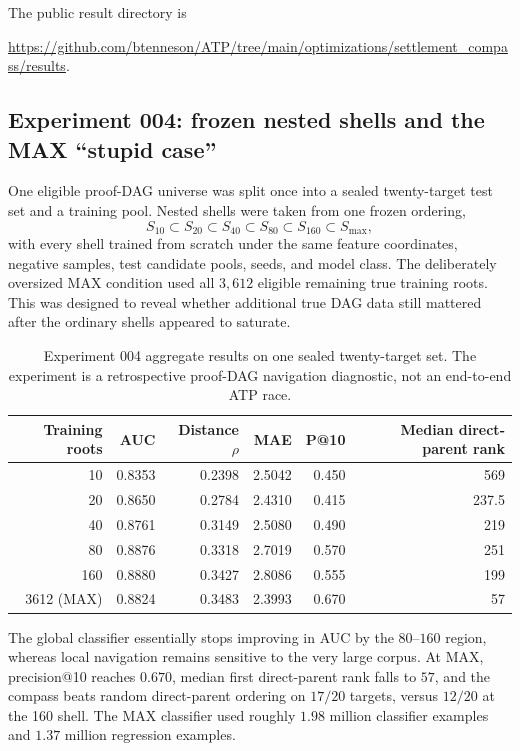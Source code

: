 The public result directory is
\begin{center}
\url{https://github.com/btenneson/ATP/tree/main/optimizations/settlement_compass/results}.
\end{center}

\subsection{Experiment 004: frozen nested shells and the MAX ``stupid case''}
One eligible proof-DAG universe was split once into a sealed twenty-target test set and a training pool. Nested shells were taken from one frozen ordering,
\[
 S_{10}\subset S_{20}\subset S_{40}\subset S_{80}\subset S_{160}\subset S_{\max},
\]
with every shell trained from scratch under the same feature coordinates, negative samples, test candidate pools, seeds, and model class. The deliberately oversized MAX condition used all $3{,}612$ eligible remaining true training roots. This was designed to reveal whether additional true DAG data still mattered after the ordinary shells appeared to saturate.

\begin{table}[ht]
\centering
\small
\setlength{\tabcolsep}{4pt}
\begin{tabular}{rrrrrr}
\toprule
Training roots & AUC & Distance $\rho$ & MAE & P@10 & Median direct-parent rank\\
\midrule
10 & 0.8353 & 0.2398 & 2.5042 & 0.450 & 569\\
20 & 0.8650 & 0.2784 & 2.4310 & 0.415 & 237.5\\
40 & 0.8761 & 0.3149 & 2.5080 & 0.490 & 219\\
80 & 0.8876 & 0.3318 & 2.7019 & 0.570 & 251\\
160 & 0.8880 & 0.3427 & 2.8086 & 0.555 & 199\\
3612 (MAX) & 0.8824 & 0.3483 & 2.3993 & 0.670 & 57\\
\bottomrule
\end{tabular}
\caption{Experiment 004 aggregate results on one sealed twenty-target set. The experiment is a retrospective proof-DAG navigation diagnostic, not an end-to-end ATP race.}
\end{table}

The global classifier essentially stops improving in AUC by the $80$--$160$ region, whereas local navigation remains sensitive to the very large corpus. At MAX, precision@10 reaches $0.670$, median first direct-parent rank falls to $57$, and the compass beats random direct-parent ordering on $17/20$ targets, versus $12/20$ at the 160 shell. The MAX classifier used roughly $1.98$ million classifier examples and $1.37$ million regression examples.

